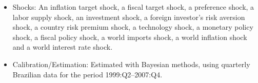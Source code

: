 \documentclass[11pt,a4paper]{article}
\begin{document}
\begin{itemize}
		\item Shocks: An inflation target shock, a fiscal target shock, a preference shock, a labor supply shock, an investment shock, a foreign investor's risk aversion shock, a country risk premium shock, a technology shock, a monetary policy shock, a fiscal policy shock, a world imports shock, a world inflation shock and a world interest rate shock.
		
		\item Calibration/Estimation: Estimated with Bayesian methods, using quarterly Brazilian data for the period 1999:Q2--2007:Q4.
		
		
		
	\end{itemize}
	
\end{document}
